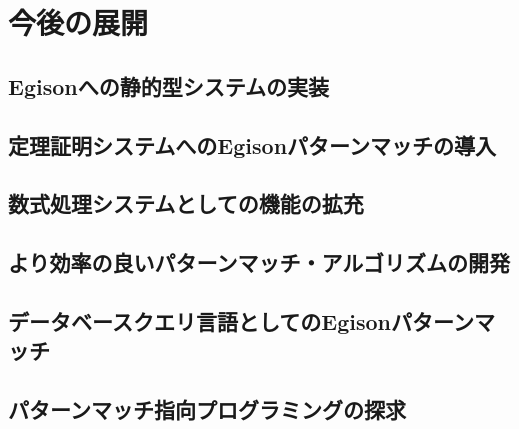 \chapter{今後の展開}\label{future}


\section{Egisonへの静的型システムの実装}

\section{定理証明システムへのEgisonパターンマッチの導入}

\section{数式処理システムとしての機能の拡充}

\section{より効率の良いパターンマッチ・アルゴリズムの開発}

\section{データベースクエリ言語としてのEgisonパターンマッチ}

\section{パターンマッチ指向プログラミングの探求}
